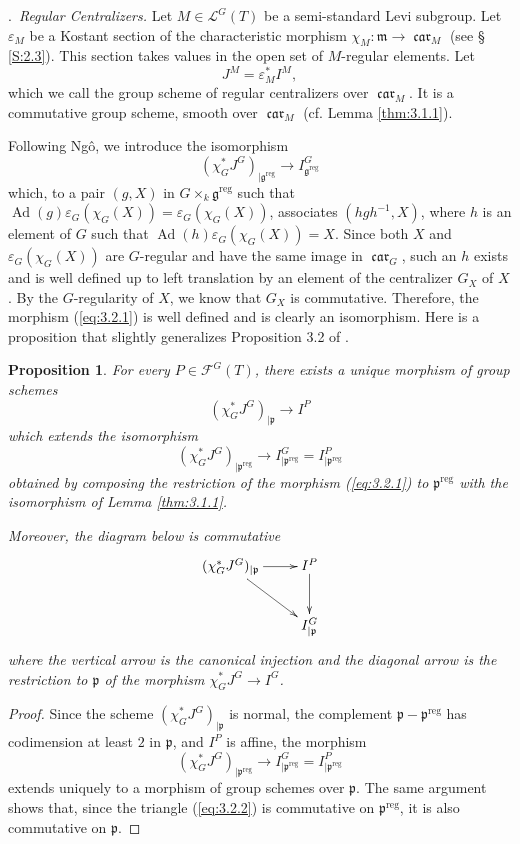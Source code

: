 \documentclass[12pt,a4paper,oneside,english,leqno]{smfart}
\makeatletter
\numberwithin{equation}{subsection}
\newcounter{theo}
\numberwithin{theo}{subsection}
\newenvironment{paragr}[1][]{\medskip\refstepcounter{subsection}%
  \par\noindent\hspace*{\parindent}\thesubsection.\ \emph{#1}%
  \@ifundefined{@empty}{}{}\ignorespaces}{\medskip}
\theoremstyle{plain}
\newtheorem{proposition}[theo]{Proposition}
\theoremstyle{definition}
\theoremstyle{remark}
\DeclareMathOperator{\reg}{reg}
\DeclareMathOperator{\Ad}{Ad}
\DeclareMathOperator{\car}{\mathfrak{car}}
\newcommand{\lc}{\mathcal{L}}
\newcommand{\fc}{\mathcal{F}}
\newcommand{\ggo}{\mathfrak{g}}
\newcommand{\mgo}{\mathfrak{m}}
\newcommand{\pgo}{\mathfrak{p}}
\newcommand{\eps}{\varepsilon}
\makeatother
\begin{document}
\begin{paragr}[Regular Centralizers.]\label{S:3.2}
Let $M\in \lc^G(T)$ be a semi-standard Levi subgroup. Let $\eps_M$ be a Kostant section of the characteristic morphism $\chi_M  : \mgo \to\car_M$ (see § \ref{S:2.3}). This section takes values in the open set of $M$-regular elements. Let
$$J^M=\eps_M^*I^M,$$
which we call the group scheme of regular centralizers over $\car_M$. It is a commutative group scheme, smooth over $\car_M$ (cf. Lemma \ref{thm:3.1.1}).

Following Ng\^o, we introduce the isomorphism
\begin{equation}\label{eq:3.2.1}
   (\chi_G^*J^G)_{|\ggo^{\reg}} \to I^G_{\ggo^{\reg}}
\end{equation}
which, to a pair $(g,X)$ in $G\times_k \ggo^{\reg}$ such that $\Ad(g)\eps_G(\chi_G(X))=\eps_G(\chi_G(X))$, associates $(hgh^{-1},X)$, where $h$ is an element of $G$ such that $\Ad(h)\eps_G(\chi_G(X))=X$. Since both $X$ and $\eps_G(\chi_G(X))$ are $G$-regular and have the same image in $\car_G$, such an $h$ exists and is well defined up to left translation by an element of the centralizer $G_X$ of $X$. By the $G$-regularity of $X$, we know that $G_X$ is commutative. Therefore, the morphism (\ref{eq:3.2.1}) is well defined and is clearly an isomorphism. Here is a proposition that slightly generalizes Proposition 3.2 of \cite{Ngo-endoscopie}.
\end{paragr}

\begin{proposition}\label{thm:3.2.1}
For every $P\in \fc^G(T)$, there exists a unique morphism of group schemes
$$(\chi_G^* J^G)_{|\pgo} \to I^P$$
which extends the isomorphism
$$(\chi_G^*J^G)_{|\pgo^{\reg}} \to I^G_{|\pgo^{\reg}}=I^P_{|\pgo^{\reg}}$$
obtained by composing the restriction of the morphism (\ref{eq:3.2.1}) to $\pgo^{\reg}$ with the isomorphism of Lemma \ref{thm:3.1.1}.

Moreover, the diagram below is commutative
\begin{equation}\label{eq:3.2.2}
 \xymatrix{    (\chi_G^* J^G)_{|\pgo}   \ar[r]     \ar[rd] &   I^P  \ar[d] \\ & I^G_{|\pgo}}
\end{equation}
where the vertical arrow is the canonical injection and the diagonal arrow is the restriction to $\pgo$ of the morphism $\chi_G^* J^G\to I^G$.
\end{proposition}

\begin{proof}
Since the scheme $(\chi_G^* J^G)_{|\pgo}$ is normal, the complement $\pgo-\pgo^{\reg}$ has codimension at least $2$ in $\pgo$, and $I^P$ is affine, the morphism
$$(\chi_G^*J^G)_{|\pgo^{\reg}} \to I^G_{|\pgo^{\reg}}=I^P_{|\pgo^{\reg}}$$
extends uniquely to a morphism of group schemes over $\pgo$. The same argument shows that, since the triangle (\ref{eq:3.2.2}) is commutative on $\pgo^{\reg}$, it is also commutative on $\pgo$.
\end{proof}
\end{document}
